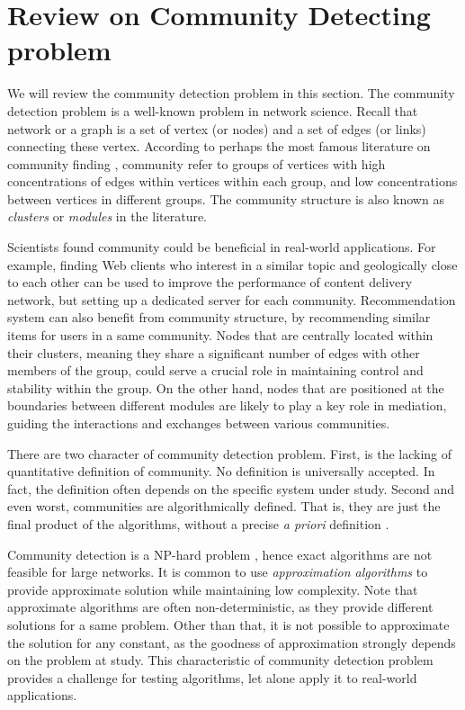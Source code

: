 \section{Review on Community Detecting problem}

We will review the community detection problem in this section.
The community detection problem is a well-known problem in network science.
Recall that network or a graph is a set of vertex (or nodes) and a set of edges (or links) connecting these vertex.
According to perhaps the most famous literature on community finding \parencite{fortunato2010},
community refer to groups of vertices with high concentrations of edges within vertices within each group,
and low concentrations between vertices in different groups.
The community structure is also known as \textit{clusters} or \textit{modules} in the literature.

Scientists found community could be beneficial in real-world applications.
For example, finding Web clients who interest in a similar topic and geologically close to each other
can be used to improve the performance of content delivery network,
but setting up a dedicated server for each community.
Recommendation system can also benefit from community structure, by recommending similar items for users in a same community.
Nodes that are centrally located within their clusters,
meaning they share a significant number of edges with other members of the group,
could serve a crucial role in maintaining control and stability within the group.
On the other hand, nodes that are positioned at the boundaries between different modules
are likely to play a key role in mediation,
guiding the interactions and exchanges between various communities.

There are two character of community detection problem.
First, is the lacking of quantitative definition of community.
No definition is universally accepted.
In fact, the definition often depends on the specific system under study.
Second and even worst, communities are algorithmically defined.
That is, they are just the final product of the algorithms,
without a precise \textit{a priori} definition \parencite{fortunato2010}.

Community detection is a NP-hard problem \parencite{fortunato2010},
hence exact algorithms are not feasible for large networks.
It is common to use \textit{approximation algorithms} to provide approximate solution while maintaining low complexity.
Note that approximate algorithms are often non-deterministic, as they provide different solutions for a same problem.
Other than that, it is not possible to approximate the solution for any constant,
as the goodness of approximation strongly depends on the problem at study.
This characteristic of community detection problem provides a challenge for
testing algorithms, let alone apply it to real-world applications.

